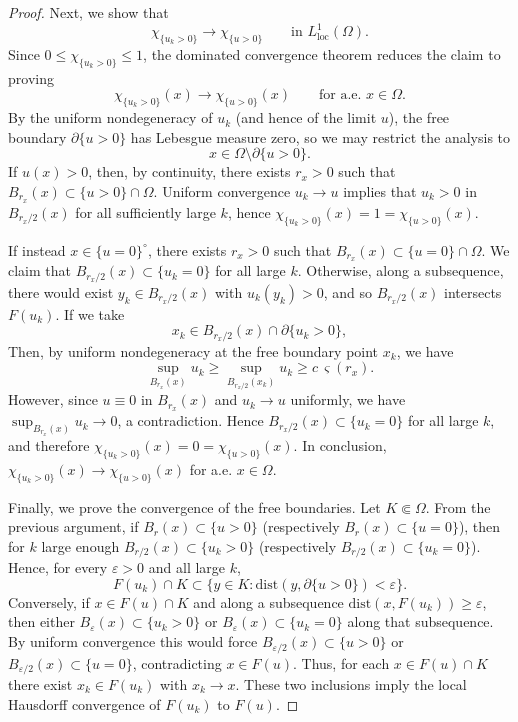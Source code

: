 \documentclass[reqno,11pt]{amsart}
\newcommand{\1}{\mathds{1}}  %
\numberwithin{equation}{section}
\begin{document}
\begin{proof}
Next, we show that
\[
    \chi_{\{u_k>0\}} \to \chi_{\{u>0\}} \qquad \text{in } L^1_{\mathrm{loc}}(\Omega).
\]
Since $0\le \chi_{\{u_k>0\}}\le 1$, the dominated convergence theorem reduces the claim to proving
\[
    \chi_{\{u_k>0\}}(x)\to \chi_{\{u>0\}}(x)\qquad \text{for a.e. }x\in\Omega.
\]
By the uniform nondegeneracy of $u_k$ (and hence of the limit $u$), the free boundary $\partial\{u>0\}$ has Lebesgue measure zero, so we may restrict the analysis to
\[
    x \in \Omega\setminus \partial\{u>0\}.
\]
If $u(x)>0$, then, by continuity, there exists $r_x>0$ such that $B_{r_x}(x)\subset\{u>0\}\cap\Omega$. Uniform convergence $u_k\to u$ implies that $u_k>0$ in $B_{r_x/2}(x)$ for all sufficiently large $k$, hence $\chi_{\{u_k>0\}}(x)=1=\chi_{\{u>0\}}(x)$.

If instead $x\in\{u=0\}^\circ$, there exists $r_x>0$ such that $B_{r_x}(x)\subset\{u=0\}\cap\Omega$. We claim that $B_{r_x/2}(x)\subset\{u_k=0\}$ for all large $k$. Otherwise, along a subsequence, there would exist $y_k\in B_{r_x/2}(x)$ with $u_k(y_k)>0$, and so $B_{r_x/2}(x)$ intersects $F(u_k)$. If we take
\[
    x_k\in B_{r_x/2}(x)\cap\partial\{u_k>0\},
\]
Then, by uniform nondegeneracy at the free boundary point $x_k$, we have
\[
    \sup_{B_{r_x}(x)} u_k \ge \sup_{B_{r_x/2}(x_k)} u_k \ge c\,\varsigma(r_x).
\]
However, since $u\equiv 0$ in $B_{r_x}(x)$ and $u_k\to u$ uniformly, we have $\sup_{B_{r_x}(x)}u_k\to 0$, a contradiction. Hence $B_{r_x/2}(x)\subset\{u_k=0\}$ for all large $k$, and therefore $\chi_{\{u_k>0\}}(x)=0=\chi_{\{u>0\}}(x)$. In conclusion, $\chi_{\{u_k>0\}}(x)\to \chi_{\{u>0\}}(x)$ for a.e. $x\in\Omega$.

Finally, we prove the convergence of the free boundaries. Let $K\Subset\Omega$. From the previous argument, if $B_r(x)\subset\{u>0\}$ (respectively $B_r(x)\subset\{u=0\}$), then for $k$ large enough $B_{r/2}(x)\subset\{u_k>0\}$ (respectively $B_{r/2}(x)\subset\{u_k=0\}$). Hence, for every $\varepsilon>0$ and all large $k$,
\[
    F(u_k)\cap K \subset \{y\in K \colon \mathrm{dist}(y,\partial\{u>0\})<\varepsilon\}.
\]
Conversely, if $x\in F(u)\cap K$ and along a subsequence $\mathrm{dist}(x,F(u_k))\geq\varepsilon$, then either $B_\varepsilon(x)\subset\{u_k>0\}$ or $B_\varepsilon(x)\subset\{u_k=0\}$ along that subsequence. By uniform convergence this would force $B_{\varepsilon/2}(x)\subset\{u>0\}$ or $B_{\varepsilon/2}(x)\subset\{u=0\}$, contradicting $x \in F(u)$. Thus, for each $x \in F(u) \cap K$ there exist $x_k\in F(u_k)$ with $x_k\to x$. These two inclusions imply the local Hausdorff convergence of $F(u_k)$ to $F(u)$.
\end{proof}
\end{document}
